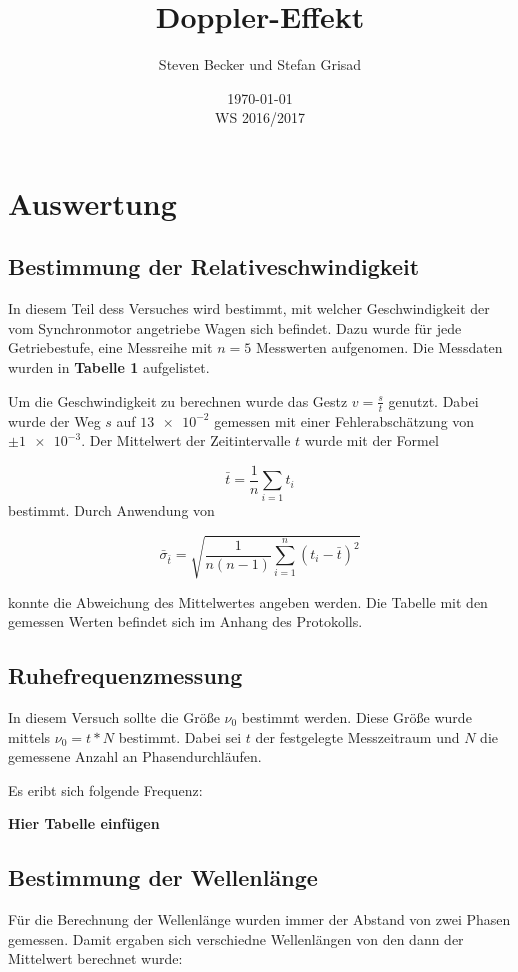 \documentclass[parskip=half]{scrartcl} %
\author{Steven Becker und Stefan Grisad}
\title{Doppler-Effekt}
\date{\today\\WS 2016/2017}
\begin{document}
\maketitle
%
\section{Auswertung}
\subsection{Bestimmung der Relativeschwindigkeit}

In diesem Teil dess Versuches wird bestimmt, mit welcher Geschwindigkeit der vom Synchronmotor angetriebe Wagen sich befindet.
Dazu wurde für jede Getriebestufe, eine Messreihe mit $n=5$ Messwerten aufgenomen.
Die Messdaten wurden in \textbf{Tabelle 1} aufgelistet.

Um die Geschwindigkeit zu berechnen wurde das Gestz $v=\frac{s}{t}$
genutzt. Dabei wurde der Weg $s$ auf $\num{13e-2}$ gemessen mit einer Fehlerabschätzung von $\pm\num{1e-3}$. 
Der Mittelwert der Zeitintervalle $t$ wurde mit der Formel

\begin{equation*}
\bar{t}=\frac{1}{n}\sum_{i=1}t_i
\end{equation*}
bestimmt. Durch Anwendung von 

\begin{equation*}
\bar{\sigma}_{\bar{t}}=\sqrt{\frac{1}{n(n-1)}\sum_{i=1}^{n}(t_i-\bar{t})^2}
\end{equation*}

konnte die Abweichung des Mittelwertes angeben werden.
Die Tabelle mit den gemessen Werten befindet sich im Anhang des Protokolls.

\subsection{Ruhefrequenzmessung}

In diesem Versuch sollte die Größe $\nu_0$ bestimmt werden. 
Diese Größe wurde mittels $\nu_0=t*N$ bestimmt. Dabei sei $t$ der 
festgelegte Messzeitraum und $N$ die gemessene Anzahl an Phasendurchläufen. 

Es eribt sich folgende Frequenz:

\textbf{Hier Tabelle einfügen}

\subsection{Bestimmung der Wellenlänge} 
Für die Berechnung der Wellenlänge wurden immer der Abstand von 
zwei Phasen gemessen. 
Damit ergaben sich verschiedne Wellenlängen von den dann 
der Mittelwert berechnet wurde:
\end{document}
